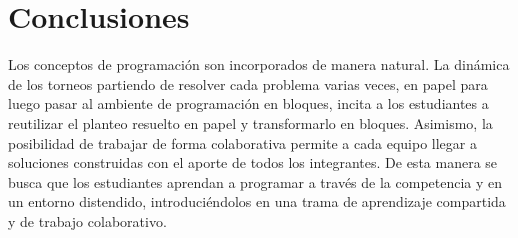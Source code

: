 \documentclass{articleteyet}
\begin{document}
\section{Conclusiones}
Los conceptos de programación son incorporados de manera natural. La dinámica de los torneos partiendo de resolver cada problema varias veces, en papel para luego pasar al ambiente de programación en bloques, incita a los estudiantes a reutilizar el planteo resuelto en papel y transformarlo en bloques.  Asimismo, la posibilidad de trabajar de forma colaborativa permite a cada equipo llegar a soluciones construidas con el aporte de todos los integrantes.
De esta manera se busca que los estudiantes aprendan a programar a través de la competencia y en un entorno distendido, introduciéndolos en una trama de aprendizaje compartida y de trabajo colaborativo. 


 



\end{document}
